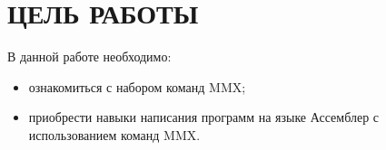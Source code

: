 \section{ЦЕЛЬ РАБОТЫ}

В данной работе необходимо:

\begin{itemize}

  \item ознакомиться с набором команд MMX;

  \item приобрести навыки написания программ на языке Ассемблер 
    с использованием команд MMX.

\end{itemize}

\newpage
